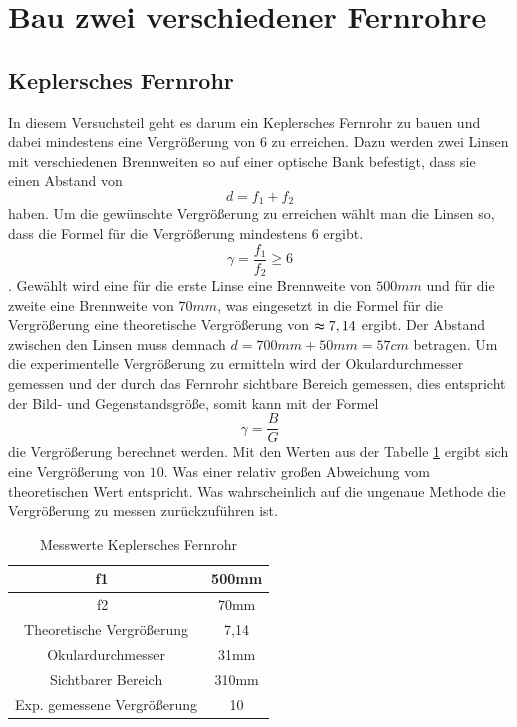 \section{Bau zwei verschiedener Fernrohre}
\subsection{Keplersches Fernrohr}

In diesem Versuchsteil geht es darum ein Keplersches Fernrohr zu bauen und dabei mindestens eine Vergrößerung von 6 zu erreichen. Dazu werden zwei Linsen mit verschiedenen Brennweiten so auf einer optische Bank befestigt, dass sie einen Abstand von $$ d = f_1 + f_2 $$ haben. Um die gewünschte Vergrößerung zu erreichen wählt man die Linsen so, dass die Formel für die Vergrößerung mindestens 6 ergibt. $$  \gamma = \frac{f_1}{f_2} \geqslant 6$$. Gewählt wird eine für die erste Linse eine Brennweite von $500mm$ und für die zweite eine Brennweite von $70mm$, was eingesetzt in die Formel für die Vergrößerung eine theoretische Vergrößerung von $\thickapprox 7,14 $ ergibt. Der Abstand zwischen den Linsen muss demnach $d = 700mm + 50mm = 57cm$ betragen.
Um die experimentelle Vergrößerung zu ermitteln wird der Okulardurchmesser gemessen und der durch das Fernrohr sichtbare Bereich gemessen, dies entspricht der Bild- und Gegenstandsgröße, somit kann mit der Formel $$ \gamma = \frac{B}{G} $$ die Vergrößerung berechnet werden. Mit den Werten aus der Tabelle \ref{tab:Tabellekeppler} ergibt sich eine Vergrößerung von $10$. Was einer relativ großen Abweichung vom theoretischen Wert entspricht. Was wahrscheinlich auf die ungenaue Methode die Vergrößerung zu messen zurückzuführen ist.

\begin{table}[h]
    \centering
    \begin{tabular}{|c|c|}
	\hline
	f1\ & 500mm \\
	\hline
	f2\ & 70mm \\
	\hline
	Theoretische Vergrößerung  & 7,14 \\
	\hline
	Okulardurchmesser & 31mm \\
	\hline
	Sichtbarer Bereich & 310mm \\
	\hline
	Exp. gemessene Vergrößerung & 10 \\
	\hline
    \end{tabular}
    \caption{Messwerte Keplersches Fernrohr}
    \label{tab:Tabellekeppler}
\end{table}

